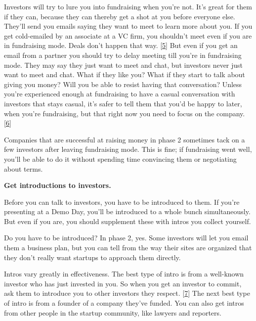 Investors will try to lure you into
                    fundraising when you're not. It's great for them if they
                    can, because they can thereby get a shot at you before
                    everyone else. They'll send you emails saying they want to
                    meet to learn more about you. If you get cold-emailed by an
                    associate at a VC firm, you shouldn't meet even if you are
                    in fundraising mode. Deals don't happen that way.
                    [\href{\#f5n}{5}]
                    But even if you get an email from a partner you should try
                    to delay meeting till you're in fundraising mode. They may
                    say they just want to meet and chat, but investors never
                    just want to meet and chat. What if they like you? What if
                    they start to talk about giving you money? Will you be able
                    to resist having that conversation? Unless you're
                    experienced enough at fundraising to have a casual
                    conversation with investors that stays casual, it's safer to
                    tell them that you'd be happy to later, when you're
                    fundraising, but that right now you need to focus on the
                    company.
                    [\href{\#f6n}{6}]

Companies that are successful at raising money
                    in phase 2 sometimes tack on a few investors after leaving
                    fundraising mode. This is fine; if fundraising went well,
                    you'll be able to do it without spending time convincing
                    them or negotiating about terms.


                    \textbf{Get introductions to investors.}

Before you
                    can talk to investors, you have to be introduced to them. If
                    you're presenting at a Demo Day, you'll be introduced to a
                    whole bunch simultaneously. But even if you are, you should
                    supplement these with intros you collect yourself.

Do
                    you have to be introduced? In phase 2, yes. Some investors
                    will let you email them a business plan, but you can tell
                    from the way their sites are organized that they don't
                    really want startups to approach them directly.

Intros
                    vary greatly in effectiveness. The best type of intro is
                    from a well-known investor who has just invested in you. So
                    when you get an investor to commit, ask them to introduce
                    you to other investors they respect.
                    [\href{\#f7n}{7}]
                    The next best type of intro is from a founder of a company
                    they've funded. You can also get intros from other people in
                    the startup community, like lawyers and reporters.


